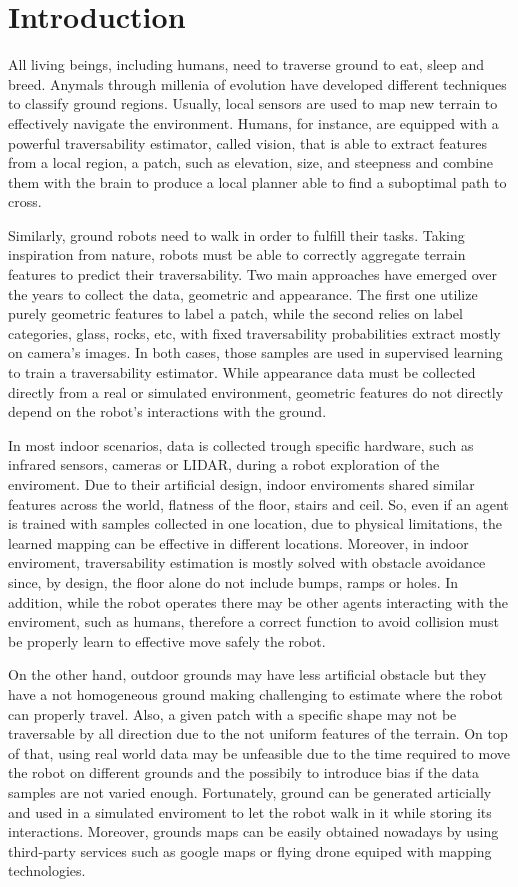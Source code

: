 \documentclass[../document.tex]{subfiles}
\begin{document}
\chapter{Introduction}

All living beings, including humans, need to traverse ground to eat, sleep and breed. Anymals through millenia of evolution have developed different techniques to classify ground regions. Usually, local sensors are used to map new terrain to effectively navigate the environment. Humans, for instance, are equipped with a powerful traversability estimator, called vision, that is able to extract features from a local region, a patch, such as elevation, size, and steepness and combine them with the brain to produce a local planner able to find a suboptimal path to cross.

Similarly, ground robots need to walk in order to fulfill their tasks. Taking inspiration from nature, robots must be able to correctly aggregate terrain features to predict their traversability. Two main approaches have emerged over the years to collect the data, geometric and appearance. The first one utilize purely geometric features to label a patch, while the second relies on label categories, glass, rocks, etc, with fixed traversability probabilities extract mostly on camera's images. In both cases, those samples are used in supervised learning to train a traversability estimator. While appearance data must be collected directly from a real or simulated environment, geometric features do not directly depend on the robot's interactions with the ground. 

In most indoor scenarios, data is collected trough specific hardware, such as infrared sensors, cameras or LIDAR, during a robot exploration of the enviroment. Due to their artificial design, indoor enviroments shared similar features across the world, flatness of the floor, stairs and ceil. So, even if an agent is trained with samples collected in one location, due to physical limitations, the learned mapping can be effective in different locations. Moreover, in indoor enviroment, traversability estimation is mostly solved with obstacle avoidance since, by design, the floor alone do not include bumps, ramps or holes. In addition, while the robot operates there may be other agents interacting with the enviroment, such as humans, therefore a correct function to avoid collision must be properly learn to effective move safely the robot.

On the other hand, outdoor grounds may have less artificial obstacle but they have a not homogeneous ground making challenging to estimate where the robot can properly travel. Also, a given patch with a specific shape may not be traversable by all direction due to the not uniform features of the terrain. On top of that, using real world data may be unfeasible due to the time required to move the robot on different grounds and the possibily to introduce bias if the data samples are not varied enough. Fortunately, ground can be generated articially and used in a simulated enviroment to let the robot walk in it while storing its interactions. Moreover, grounds maps can be easily obtained nowadays by using third-party services such as google maps or flying drone equiped with mapping technologies.
\end{document}
